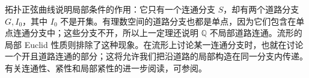 拓扑正弦曲线说明局部条件的作用：它只有一个连通分支 \(S\)，却有两个道路分支 \(G,I_0\)，其中 \(I_0\) 不是开集。有理数空间的道路分支也都是单点，因为它们包含在单点连通分支中；这些分支不开，所以上一定理还说明 \(\mathbb Q\) 不局部道路连通。流形的局部 Euclid 性质则排除了这种现象。在流形上讨论某一连通分支时，也就在讨论一个开且道路连通的部分；这将允许我们把沿道路的局部构造在同一分支内传递。有关连通性、紧性和局部紧性的进一步阅读，可参阅\cite[第4章, Connectedness, 第86页; Compactness, 第94页; Local Compactness, 第104页]{Lee2011Topological}。
